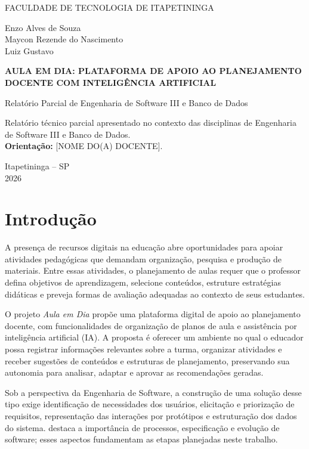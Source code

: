 \documentclass[12pt,a4paper,oneside]{report}
\begin{document}
\begin{titlepage}
\centering
{\large FACULDADE DE TECNOLOGIA DE ITAPETININGA\par}
\vspace{2cm}
{\large Enzo Alves de Souza\\ Maycon Rezende do Nascimento\\ Luiz Gustavo\par}
\vfill
{\bfseries\Large AULA EM DIA: PLATAFORMA DE APOIO AO PLANEJAMENTO DOCENTE COM INTELIGÊNCIA ARTIFICIAL\par}
\vspace{1cm}
{\large Relatório Parcial de Engenharia de Software III e Banco de Dados\par}
\vfill
\begin{flushright}
\begin{minipage}{0.58\textwidth}
Relatório técnico parcial apresentado no contexto das disciplinas de Engenharia de Software III e Banco de Dados.\\
\textbf{Orientação:} [NOME DO(A) DOCENTE].
\end{minipage}
\end{flushright}
\vfill
{Itapetininga -- SP\\2026\par}
\end{titlepage}
\tableofcontents
\clearpage

\chapter{Introdução}
A presença de recursos digitais na educação abre oportunidades para apoiar atividades pedagógicas que demandam organização, pesquisa e produção de materiais. Entre essas atividades, o planejamento de aulas requer que o professor defina objetivos de aprendizagem, selecione conteúdos, estruture estratégias didáticas e preveja formas de avaliação adequadas ao contexto de seus estudantes.

O projeto \textit{Aula em Dia} propõe uma plataforma digital de apoio ao planejamento docente, com funcionalidades de organização de planos de aula e assistência por inteligência artificial (IA). A proposta é oferecer um ambiente no qual o educador possa registrar informações relevantes sobre a turma, organizar atividades e receber sugestões de conteúdos e estruturas de planejamento, preservando sua autonomia para analisar, adaptar e aprovar as recomendações geradas.

Sob a perspectiva da Engenharia de Software, a construção de uma solução desse tipo exige identificação de necessidades dos usuários, elicitação e priorização de requisitos, representação das interações por protótipos e estruturação dos dados do sistema. \citet{sommerville2016} destaca a importância de processos, especificação e evolução de software; esses aspectos fundamentam as etapas planejadas neste trabalho.
\end{document}
